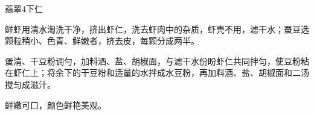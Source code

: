 \begin{recipe}{翡翠4下仁}

\ingredients


\cooking

\step 鲜虾用清水淘洗干净，挤出虾仁，洗去虾肉中的杂质，虾壳不用，滤干水；蚕豆选颗粒稍小、色青、鲜嫩者，挤去皮，每颗分成两半。

\step 蛋清、干豆粉调勻，加料酒、盐、胡椒面，与滤干水份盼虾仁共同拌匀，使豆粉粘在虾仁上；将余下的干豆粉和适量的水拌成水豆粉，再加料酒、盐、胡椒面和二汤搅匀成滋汁。

\notes

鲜嫩可口，颜色鲜艳美观。

\end{recipe}


